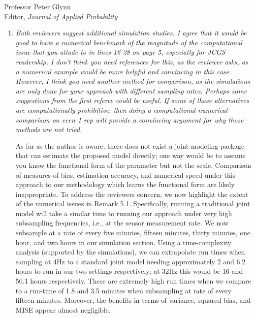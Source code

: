 \documentclass[11pt]{letter} %
\begin{document}
\begin{letter}{Professor
	Peter Glynn\\
	Editor, {\em Journal of Applied Probability}}
\begin{enumerate}
\vspace{5mm}
To accommodate the second referee's request without making the discussion too long, we have re-written the technical proofs to include the intuition and integrated this with our detailed proof. We point the interested reader to these details in the main paper.  We hope this helps the reader develop intuition on the first read while giving them some helpful guidance in order to facilitate understanding of the detailed theoretical analysis.
\vspace{5mm}

\item {\it Both reviewers suggest additional simulation studies. I agree that it would be good to have a numerical benchmark of the magnitude of the computational issue that you allude to in lines 16-28 on page 5, especially for JCGS readership. I don’t think you need references for this, as the reviewer asks, as a numerical example would be more helpful and convincing in this case. However, I think you need another method for comparison, as the simulations are only done for your approach with different sampling rates. Perhaps some suggestions from the first referee could be useful. If some of these alternatives are computationally prohibitive, then doing a computational numerical comparison on even 1 rep will provide a convincing argument for why those methods are not tried.}

\vspace{5mm}
As far as the author is aware, there does not exist a joint modeling package that can estimate the proposed model directly; one way would be to assume you know the functional form of the parameter but not the scale.  Comparison of measures of bias, estimation accuracy, and numerical speed under this approach to our methodology which learns the functional form are likely inappropriate. To address the reviewers concern, we now highlight the extent of the numerical issues in Remark 5.1.  Specifically, running a traditional joint model will take a similar time to running our approach under very high subsampling frequencies, i.e., at the sensor measurement rate.  We now subsample at a rate of every five minutes, fifteen minutes, thirty minutes, one hour, and two hours in our simulation section.  Using a time-complexity analysis (supported by the simulations), we can extrapolate run times when sampling at 4Hz to a standard joint model needing approximately 2 and 6.2 hours to run in our two settings respectively; at 32Hz this would be 16 and 50.1 hours respectively. These are extremely high run times when we compare to a run-time of 1.8 and 3.5 minutes when subsampling at rate of every fifteen minutes.  Moreover, the benefits in terms of variance, squared bias, and MISE appear almost negligible.
\vspace{5mm}


\end{enumerate}
\end{letter}
\end{document}

